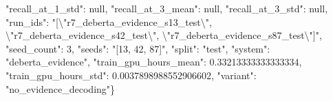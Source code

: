 "recall\_at\_1\_std": null, "recall\_at\_3\_mean": null, "recall\_at\_3\_std": null, "run\_ids": "[\textbackslash{}"r7\_deberta\_evidence\_s13\_test\textbackslash{}", \textbackslash{}"r7\_deberta\_evidence\_s42\_test\textbackslash{}", \textbackslash{}"r7\_deberta\_evidence\_s87\_test\textbackslash{}"]", "seed\_count": 3, "seeds": "[13, 42, 87]", "split": "test", "system": "deberta\_evidence", "train\_gpu\_hours\_mean": 0.33213333333333334, "train\_gpu\_hours\_std": 0.0037898988552906602, "variant": "no\_evidence\_decoding"\}
